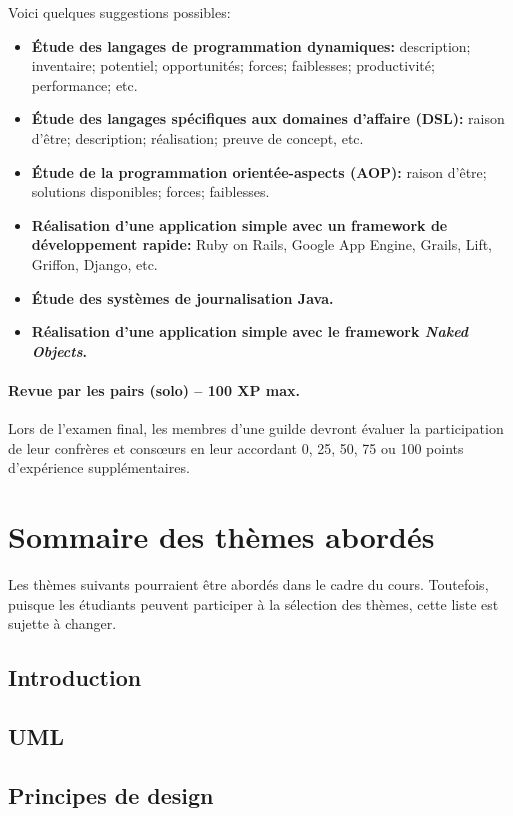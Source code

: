 \documentclass{article}
\begin{document}
Voici quelques suggestions possibles:
\begin{itemize}
\item \textbf{Étude des langages de programmation dynamiques:} description; inventaire; potentiel; opportunités; forces; faiblesses; productivité; performance; etc.
\item \textbf{Étude des langages spécifiques aux domaines d'affaire (DSL):} raison d'être; description; réalisation; preuve de concept, etc.
\item \textbf{Étude de la programmation orientée-aspects (AOP):} raison d'être; solutions disponibles; forces; faiblesses.
\item \textbf{Réalisation d'une application simple avec un framework de développement rapide:} Ruby on Rails, Google App Engine, Grails, Lift, Griffon, Django, etc.
\item \textbf{Étude des systèmes de journalisation Java.}
\item \textbf{Réalisation d'une application simple avec le framework \emph{Naked Objects}.}
\end{itemize}

\paragraph{Revue par les pairs (solo) -- 100 XP max.}
\label{par:revue_par_les_pairs_100_xp}

Lors de l'examen final, les membres d'une guilde devront évaluer la participation de leur confrères et cons\oe{}urs en leur accordant 0, 25, 50, 75 ou 100 points d'expérience supplémentaires.

\section{Sommaire des thèmes abordés}
\label{sec:sommaire_des_themes_abordes}

Les thèmes suivants pourraient être abordés dans le cadre du cours. Toutefois, puisque les étudiants peuvent participer à la sélection des thèmes, cette liste est sujette à changer.

\subsection{Introduction}
\subsection{UML}
\subsection{Principes de design}
\end{document}
